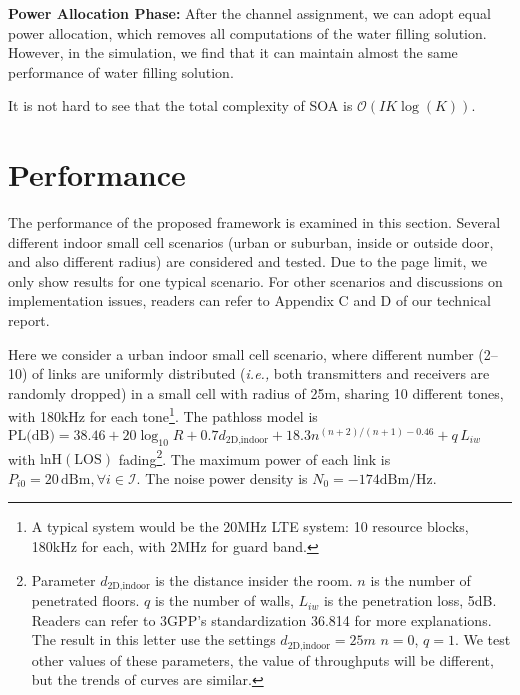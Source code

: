 \documentclass[conference]{IEEEtran}
\newcommand{\ie}{\emph{i.e., }}
\newcommand{\mi}{\mathcal{I}}
\begin{document}
 {\bf Power Allocation Phase:} After the channel assignment, we can adopt equal power allocation, which removes all computations of the water filling solution. However, in the simulation, we find that it can maintain almost the same performance of water filling solution.

It is not hard to see that the total complexity of SOA is $\mathcal{O}(I K \log(K))$.



\section{Performance}
\label{sec:performance}
The performance of the proposed framework is examined in this section. Several different indoor small cell scenarios (urban or suburban, inside or outside door, and also different radius) are considered and tested. Due to the page limit, we only show results for one typical scenario. For other scenarios and discussions on implementation issues, readers can refer to Appendix C and D of our technical report.

Here we consider a urban indoor small cell scenario, where different number (2--10) of links are uniformly distributed (\ie both transmitters and receivers are randomly dropped) in a small cell with radius of 25m, sharing 10 different tones, with 180kHz for each tone\footnote{A typical system would be the 20MHz LTE system: 10 resource blocks, 180kHz for each, with 2MHz for guard band.}. The pathloss model is $\text{PL(dB)}=38.46+20\log_{10}R+0.7d_\text{2D,indoor}+18.3n^{(n+2)/(n+1)-0.46}+q\,L_{iw}$ with $\text{lnH}(\text{LOS})$ fading\footnote{Parameter $d_\text{2D,indoor}$ is the distance insider the room. $n$ is the number of penetrated floors. $q$ is the number of walls, $L_{iw}$ is the penetration loss, 5dB. Readers can refer to 3GPP's standardization 36.814 for more explanations. The result in this letter use the settings $d_\text{2D,indoor}=25m$ $n=0$, $q=1$. We test other values of these parameters, the value of throughputs will be different, but the trends of curves are similar.}. The maximum power of each link is $P_{i0}=20\,\text{dBm}, \forall i\in \mi$.
The noise power density is $N_0=-174\text{dBm}/\text{Hz}$. 
\end{document}
